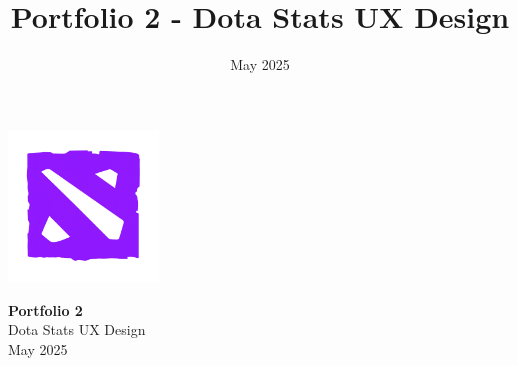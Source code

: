 \documentclass{article}
\title{Portfolio 2 - Dota Stats UX Design}
\date{May 2025}
\begin{document}
    \begin{titlepage}
        \centering
        \vspace*{2cm}

        \includegraphics[width=0.3\textwidth]{images/logo}

        \vspace{2cm}
        {\Huge \textbf{Portfolio 2}}\\[0.5cm]
        {\LARGE Dota Stats UX Design}\\[1cm]

        \vfill
        {\large May 2025}
    \end{titlepage}

    
    
    
    
    
    
    
\end{document}
